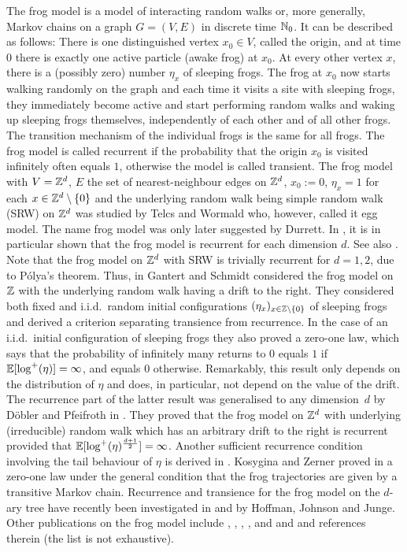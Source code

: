 The frog model is a model of interacting random walks or, more generally, Markov chains on a graph $G=(V,E)$ in discrete time $\mathbb{N}_0$. It can be described as follows: There is one distinguished 
vertex $x_0\in V$, called the origin, and at time $0$ there is exactly one active particle (awake frog) at $x_0$. At every other vertex $x$, there is a (possibly zero) number $\eta_x$ of sleeping frogs. 
The frog at $x_0$ now starts walking randomly on the graph and each time it visits a site with sleeping frogs, they immediately become active and start performing random walks and waking up sleeping frogs themselves, independently of each other and of all other frogs. The transition mechanism of the individual frogs is the same for all frogs. The frog model is called recurrent if the probability that the origin $x_0$
is visited infinitely often equals $1$, otherwise the model is called transient. The frog model with $V=\mathbb{Z}^d$, $E$ the set of nearest-neighbour edges on $\mathbb{Z}^d$, $x_0:=0$, $\eta_x=1$ for each $x\in\mathbb{Z}^d\setminus\{0\}$ and the underlying random walk being simple random walk (SRW) on $\mathbb{Z}^d$ was studied by Telcs and Wormald \cite{TW99} who, however, called it egg model. The name frog model was only later suggested by Durrett. 
In \cite{TW99}, it is in particular shown that the frog model is recurrent for each dimension $d$. See also \cite{P01}.
Note that the frog model on $\mathbb{Z}^d$ with SRW is trivially recurrent for $d=1,2$, due to P\'{o}lya's theorem. Thus, in \cite{GS09} Gantert and Schmidt considered the frog model on $\mathbb{Z}$ with the underlying random walk having a drift to the right. They considered both fixed and i.i.d.~random initial configurations $(\eta_x)_{x\in\mathbb{Z}\setminus\{0\}}$ of sleeping frogs and derived a criterion separating transience from recurrence. In the case of an i.i.d.~initial configuration of sleeping frogs they also proved a zero-one law, which says that the probability of infinitely many returns to $0$ equals $1$ if $\mathbb{E}[\log^+(\eta)]=\infty$, and equals $0$ otherwise. Remarkably, this result only depends on the distribution of $\eta$ and does, in particular, not depend on the value of the drift. 
The recurrence part of the latter result was generalised to any dimension~$d$ by D\"obler and Pfeifroth in \cite{DP14}. They proved that the frog model on $\mathbb{Z}^d$ with underlying (irreducible) random walk which has an arbitrary drift to the right is recurrent provided that $\mathbb{E}[\log^+(\eta)^{\frac{d+1}{2}}]=\infty$. Another sufficient recurrence condition involving the tail behaviour of $\eta$ is derived in \cite{KZ17}. 
Kosygina and Zerner proved in \cite{KZ17} a zero-one law under the general condition that the frog trajectories are given by a transitive Markov chain. 
Recurrence and transience for the frog model on the $d$-ary tree have recently been investigated in \cite{HJJ14} and \cite{HJJ16} by Hoffman, Johnson and Junge. 
Other publications on the frog model include \cite{AMP02}, \cite{FMS04}, \cite{GNR17}, \cite{HW16}, \cite{JJ16} and \cite{JJ16sto} and \cite{R17} and references therein (the list is not exhaustive).

